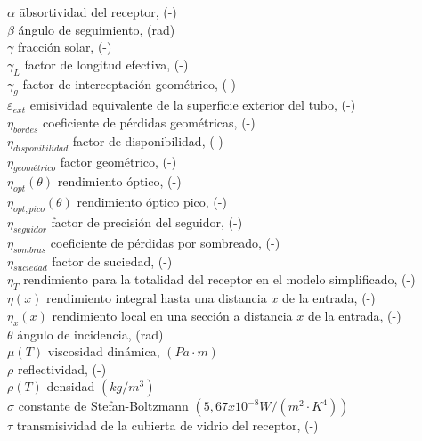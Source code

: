 \begin{tabbing}
$\alpha$ \quad\quad\quad\quad\quad\= absortividad del receptor, (-) \\
$\beta$ \> ángulo de seguimiento, (rad) \\
$\gamma$ \> fracción solar, (-) \\
$\gamma_L$ \>  factor de longitud efectiva, (-)  \\
$\gamma_g$  \> factor de interceptación geométrico, (-)  \\
$\varepsilon_{ext}$ \> emisividad equivalente de la superficie exterior del tubo, (-) \\
$\eta_{bordes}$ \> coeficiente de pérdidas geométricas, (-)  \\
$\eta_{disponibilidad}$ \> factor de disponibilidad, (-) \\
$\eta_{geométrico}$ \> factor geométrico, (-) \\
$\eta_{opt}(\theta)$  \> rendimiento óptico, (-)  \\
$\eta_{opt,pico}(\theta)$  \> rendimiento óptico pico, (-)  \\
$\eta_{seguidor}$ \> factor de precisión del seguidor, (-) \\
$\eta_{sombras}$ \> coeficiente de pérdidas por sombreado, (-)  \\
$\eta_{suciedad}$ \> factor de suciedad, (-) \\
$\eta_{T}$ \> rendimiento para la totalidad del receptor en el modelo simplificado, (-)  \\
$\eta(x)$ \> rendimiento integral hasta una distancia $x$ de la entrada, (-)  \\
$\eta_x(x)$ \> rendimiento local en una sección a distancia $x$ de la entrada, (-) \\
$\theta$ \> ángulo de incidencia, (rad) \\
$\mu(T)$ \> viscosidad dinámica, $(Pa \cdot m)$ \\
$\rho$ \> reflectividad, (-) \\
$\rho(T)$ \> densidad $(kg/m^3)$ \\
$\sigma$ \> constante de Stefan-Boltzmann $(5,67x10^{-8} W/(m^2 \cdot K^4))$\\
$\tau$ \> transmisividad de la cubierta de vidrio del receptor, (-) 
\end{tabbing}

